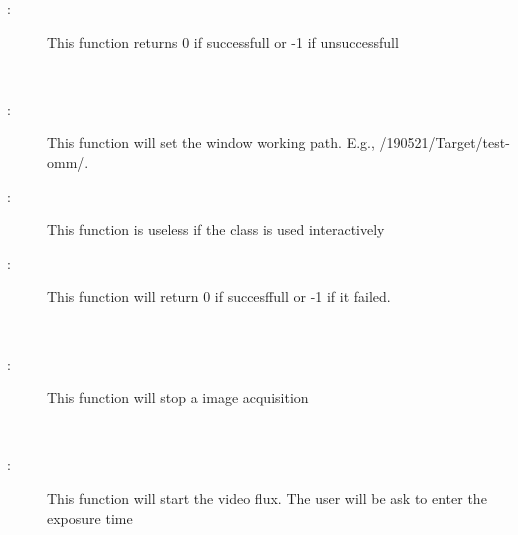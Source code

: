 \documentclass[letterpaper,10pt,english]{sphinxmanual}
\begin{document}
\begin{fulllineitems}
\begin{fulllineitems}
\begin{description}
\item[{:}] \leavevmode
This function returns 0 if successfull or -1 if unsuccessfull

\end{description}

\end{fulllineitems}


\begin{fulllineitems}
\label{\detokenize{index:python_andor.command.set_path}}~\begin{description}
\item[{:}] \leavevmode
This function will set the window working path. E.g., /190521/Target/test-omm/.

\item[{:}] \leavevmode
This function is useless if the class is used interactively

\item[{:}] \leavevmode
This function will return 0 if succesffull or -1 if it failed.

\end{description}

\end{fulllineitems}


\begin{fulllineitems}
\label{\detokenize{index:python_andor.command.stop_acq}}~\begin{description}
\item[{:}] \leavevmode
This function will stop a image acquisition

\end{description}

\end{fulllineitems}


\begin{fulllineitems}
\label{\detokenize{index:python_andor.command.video}}~\begin{description}
\item[{:}] \leavevmode
This function will start the video flux. The user will be ask to enter the exposure time


\end{description}
\end{fulllineitems}
\end{fulllineitems}
\end{document}
